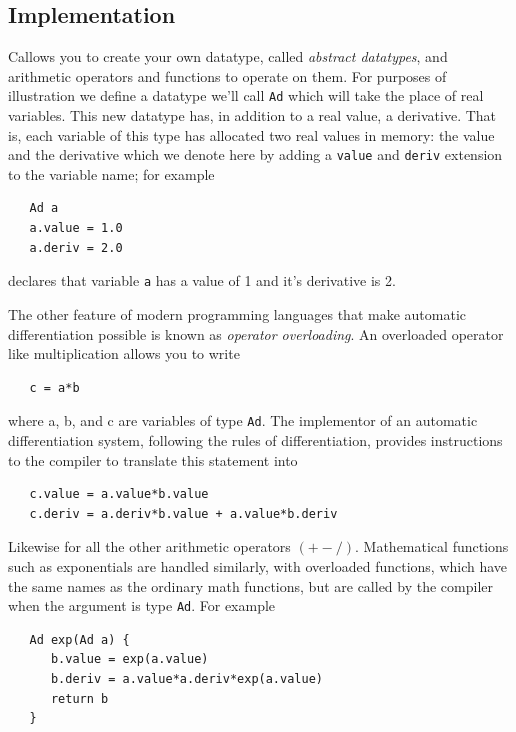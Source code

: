 \documentclass[11pt,openany,twoside]{book}
\numberwithin{equation}{section}		%
\def\Cpp{{C\nolinebreak[4]\hspace{-.05em}\raisebox{.4ex}{\tiny\bf ++}}\:}
\newcommand{\Newterm}[1]{{\em #1}}
\newcommand{\Code}[1]{{\small\tt #1}}
\begin{document}
\subsection{Implementation}
\Cpp allows you to create your own datatype, called
\Newterm{abstract datatypes}, and arithmetic operators and
functions to operate on them.
For purposes of illustration we define a
datatype we'll call \Code{Ad}\index{Ad@\Code{Ad} datatype}
which will take the place
of real variables. This new datatype has, in addition to
a real value, a derivative. That is, each variable of this 
type has allocated two real values in memory: the value and
the derivative which we denote here by adding a
\Code{value} and \Code{deriv} extension to the
variable name; for example
\begin{lstlisting}
   Ad a
   a.value = 1.0
   a.deriv = 2.0
\end{lstlisting}

declares that variable \Code{a} has a value of 1 and
it's derivative is 2.
\par
The other feature of modern programming
languages that make automatic differentiation possible is
known as \Newterm{operator overloading}. An overloaded
operator like multiplication allows you to write
\begin{lstlisting}
   c = a*b
\end{lstlisting}

where a, b, and c are variables of type \Code{Ad}.
The implementor of an automatic differentiation system,
following the rules of differentiation,
provides instructions to the compiler to translate this statement into
\begin{lstlisting}
   c.value = a.value*b.value
   c.deriv = a.deriv*b.value + a.value*b.deriv
\end{lstlisting}

Likewise for all the other arithmetic operators $(+-/)$.
Mathematical functions such as exponentials are handled similarly,
with overloaded functions, which have the same names
as the ordinary math functions, but are called by the compiler
when the argument is type \Code{Ad}.
For example
\begin{lstlisting}
   Ad exp(Ad a) {
      b.value = exp(a.value)
      b.deriv = a.value*a.deriv*exp(a.value)
      return b
   }
\end{lstlisting}
\end{document}
